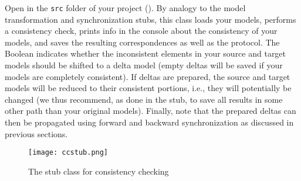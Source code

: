 Open  in the \texttt{src} folder of your project ().
By analogy to the model transformation and synchronization stubs, this class loads your models, performs a consistency check, prints info in the console about the consistency of your models, and saves the resulting correspondences as well as the protocol.
The Boolean  indicates whether the inconsistent elements in your source and target models should be shifted to a delta model (empty deltas will be saved if your models are completely consistent).
If deltas are prepared, the source and target models will be reduced to their consistent portions, i.e., they will potentially be changed (we thus recommend, as done in the stub, to save all results in some other path than your original models).
Finally, note that the prepared deltas can then be propagated using forward and backward synchronization as discussed in previous sections.

\begin{figure}[htbp]
\renewcommand\figurename{Figure}
\begin{center}
\texttt{[image: ccstub.png]}
\caption{The stub class for consistency checking}
\label{eclipse:ccstub}
\end{center}
\end{figure}

